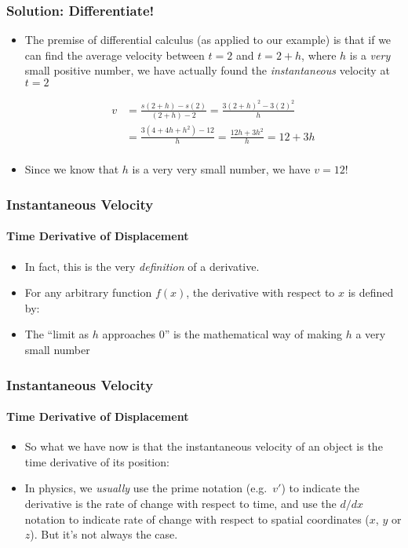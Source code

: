 \documentclass[12pt,compress,aspectratio=169]{beamer}
\begin{document}
\begin{frame}
  \frametitle{Solution: Differentiate!}
  \begin{itemize}
  \item The premise of differential calculus (as applied to our example) is
    that if we can find the average velocity between $t=2$ and
    $t=2+h$, where $h$ is a \emph{very} small positive number, we have
    actually found the \emph{instantaneous} velocity at $t=2$

    \begin{align*}
      v&=\frac{s(2+h)-s(2)}{(2+h)-2}=\frac{3(2+h)^2-3(2)^2}{h}\\
      &=\frac{3(4+4h+h^2)-12}{h}=\frac{12h+3h^2}{h}=12+3h\\
    \end{align*}
  \item Since we know that $h$ is a very very small number, we have $v=12$!
  \end{itemize}
\end{frame}


\begin{frame}
  \frametitle{Instantaneous Velocity}
  \framesubtitle{Time Derivative of Displacement}
  \begin{itemize}
  \item In fact, this is the very \emph{definition} of a derivative.
  \item For any arbitrary function $f(x)$, the derivative with respect to $x$
    is defined by:

  \item The ``limit as $h$ approaches $0$'' is the mathematical way of making
    $h$ a very small number
  \end{itemize}
\end{frame}

\begin{frame}
  \frametitle{Instantaneous Velocity}
  \framesubtitle{Time Derivative of Displacement}
  \begin{itemize}
  \item So what we have now is that the instantaneous velocity of an object is
    the time derivative of its position:
    
  
  \item In physics, we \emph{usually} use the prime notation (e.g.\ $v'$) to
    indicate the derivative is the rate of change with respect to time, and use
    the $d/dx$ notation to indicate rate of change with respect to spatial
    coordinates ($x$, $y$ or $z$). But it's not always the case.
  \end{itemize}
\end{frame}
\end{document}
